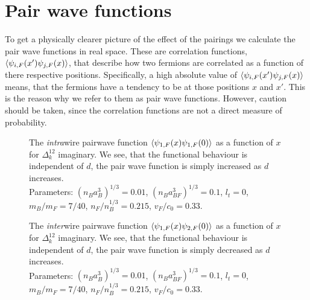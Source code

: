 \section{Pair wave functions} \label{sec.pairwavefunctions}
To get a physically clearer picture of the effect of the pairings we calculate the pair wave functions in real space. These are correlation functions, $\braket{\psi_{i,F}(x')\psi_{j,F}(x)}$, that describe how two fermions are correlated as a function of there respective positions. Specifically, a high absolute value of $\braket{\psi_{i,F}(x')\psi_{j,F}(x)}$ means, that the fermions have a tendency to be at those positions $x$ and $x'$. This is the reason why we refer to them as pair wave functions. However, caution should be taken, since the correlation functions are not a direct measure of probability. 

\begin{figure} 
\begin{center}  
  
\caption{The \textit{intra}wire pairwave function $\braket{\psi_{1,F}(x)\psi_{1,F}(0)}$ as a function of $x$ for $\Delta^{12}_k$ imaginary. We see, that the functional behaviour is independent of $d$, the pair wave function is simply increased as $d$ increases. \\
Parameters: $(n_Ba_B^3)^{1/3} = 0.01$, $(n_Ba_{BF}^3)^{1/3} = 0.1$, $l_t = 0$, $m_B / m_F = 7/40$, $n_F / n_B^{1/3} = 0.215$, $v_F / c_0 = 0.33$. }  
\label{fig.2wirespairwavefunction11}  
\vspace{0.5cm}
  
\caption{The \textit{inter}wire pairwave function $\braket{\psi_{1,F}(x)\psi_{2,F}(0)}$ as a function of $x$ for $\Delta^{12}_k$ imaginary. We see, that the functional behaviour is independent of $d$, the pair wave function is simply decreased as $d$ increases. \\
Parameters: $(n_Ba_B^3)^{1/3} = 0.01$, $(n_Ba_{BF}^3)^{1/3} = 0.1$, $l_t = 0$, $m_B / m_F = 7/40$, $n_F / n_B^{1/3} = 0.215$, $v_F / c_0 = 0.33$. }  
\label{fig.2wirespairwavefunction12}  
\end{center}    
\end{figure}

